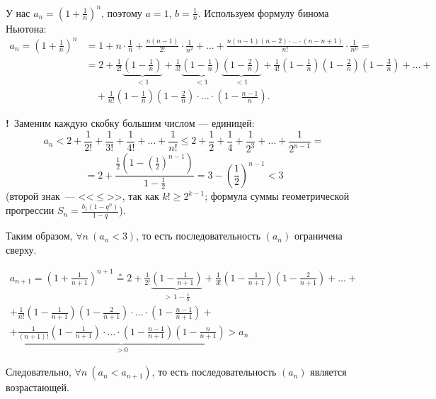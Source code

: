 \documentclass[a4paper,11pt]{article}
\newcommand{\imp}{\textbf{\color{red!70!black}!}\ }
\begin{document}
У нас $a_n = \left( 1 + \frac{1}{n} \right)^n$, поэтому $a = 1$, $b = \frac{1}{n}$.
Используем формулу бинома Ньютона:
\begin{align*}
  a_n = \left( 1 + \frac{1}{n} \right)^n
    &= 1 + n \cdot \frac{1}{n} + \frac{n(n-1)}{2!} \cdot \frac{1}{n^2} + \ldots
       + \frac{n(n-1)(n-2)\cdot\ldots\cdot(n-n+1)}{n!} \cdot \frac{1}{n^n} = \\
    &= 2 + \frac{1}{2!}\underbrace{\left( 1 - \frac{1}{n} \right)}_{<1}
       + \frac{1}{3!}\underbrace{\left( 1 - \frac{1}{n} \right)}_{<1}
                     \underbrace{\left( 1 - \frac{2}{n} \right)}_{<1}
       + \frac{1}{4!}\left( 1 - \frac{1}{n} \right)\left( 1 - \frac{2}{n} \right)\left( 1 - \frac{3}{n} \right)
       + \ldots + {}\\
    &\quad + \frac{1}{n!}\left( 1 - \frac{1}{n} \right)\left( 1 - \frac{2}{n} \right)
       \cdot\ldots\cdot\left( 1 - \frac{n-1}{n} \right).
\end{align*}

\imp Заменим каждую скобку большим числом --- единицей:
\[
  a_n < 2 + \frac{1}{2!} + \frac{1}{3!} + \frac{1}{4!} + \ldots + \frac{1}{n!}
    \le 2 + \frac{1}{2} + \frac{1}{4} + \frac{1}{2^3} + \ldots + \frac{1}{2^{n-1}} =
\]
\[
  = 2 + \frac{\frac{1}{2}\left( 1 - \left( \frac{1}{2} \right)^{n-1} \right)}{1 - \frac{1}{2}}
  = 3 - \left( \frac{1}{2} \right)^{n-1} < 3
\]
(второй знак~--- <<$\le$>>, так как $k!\ge 2^{k-1}$; формула суммы геометрической прогрессии $S_n = \frac{b_1(1 - q^n)}{1 - q}$).

Таким образом, $\forall n\ (a_n < 3)$, то есть последовательность $(a_n)$ ограничена сверху.

\begin{multline*}
  a_{n+1} = \left( 1 + \frac{1}{n+1} \right)^{n+1} \overset{*}{=}
    2 + \frac{1}{2!}\underbrace{\left( 1 - \frac{1}{n+1} \right)}_{>\,1 - \frac{1}{n}}
    + \frac{1}{3!}\left( 1 - \frac{1}{n+1} \right)\left( 1 - \frac{2}{n+1} \right) + \ldots + {}\\
  + \frac{1}{n!}\left( 1 - \frac{1}{n+1} \right)\left( 1 - \frac{2}{n+1} \right)
      \cdot\ldots\cdot\left( 1 - \frac{n-1}{n+1} \right) + {}\\
  + \underbrace{\frac{1}{(n+1)!}\left( 1 - \frac{1}{n+1} \right)\cdot\ldots\cdot
      \left( 1 - \frac{n-1}{n+1} \right)\left( 1 - \frac{n}{n+1} \right)}_{>0} > a_n
\end{multline*}

Следовательно, $\forall n\ (a_n < a_{n+1})$, то есть последовательность $(a_n)$ является возрастающей.
\end{document}

